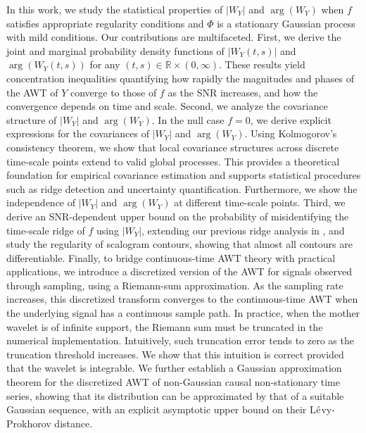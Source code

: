 \documentclass{amsart}
\begin{document}
In this work,
we study the statistical properties of $|W_{Y}|$ and $\arg(W_{Y})$ when $f$ satisfies appropriate regularity conditions and $\Phi$ is a stationary Gaussian process \cite{major1981lecture} with mild conditions.
Our contributions are multifaceted.
First, we derive the joint and marginal probability density functions of $|W_{Y}(t,s)|$ and $\arg(W_{Y}(t,s))$ for any $(t,s)\in \mathbb{R}\times (0,\infty)$.
These results yield concentration inequalities quantifying how rapidly the magnitudes and phases of the AWT of $Y$ converge to those of  $f$ as the SNR increases, and how the convergence depends on time and scale.
%
Second, we analyze the covariance structure of $|W_{Y}|$ and $\arg(W_{Y})$.
In the null case $f=0$, we derive explicit expressions for the covariances of $|W_{Y}|$ and $\arg(W_{Y})$. Using Kolmogorov's consistency theorem, we show that local covariance structures across discrete time-scale points extend to valid global processes. This provides a theoretical foundation for empirical covariance estimation and supports statistical procedures such as ridge detection and uncertainty quantification. Furthermore, we show the independence of $|W_{Y}|$ and $\arg(W_{Y})$ at different time-scale points.
%
Third, we derive an SNR-dependent upper bound on the probability of misidentifying the time-scale ridge of $f$ using $|W_Y|$, extending our previous ridge analysis in \cite{liu2024analyzing}, and study the regularity of scalogram contours, showing that almost all contours are differentiable.
Finally, to bridge continuous-time AWT theory with practical applications,
we introduce a discretized version of the AWT for signals observed through sampling, using a Riemann-sum
approximation. As the sampling rate increases, this discretized transform converges
 to the continuous-time AWT when the underlying signal has a continuous
 sample path. In practice, when the mother wavelet is of infinite support, the Riemann sum must be truncated in the numerical implementation. Intuitively, such truncation error tends to zero as the truncation threshold
 increases. We show that this intuition is correct provided that the wavelet is integrable.
We further establish a Gaussian approximation theorem for the discretized AWT of non-Gaussian causal non-stationary time series, showing that its distribution can be approximated by that of a suitable Gaussian sequence, with an explicit asymptotic upper bound on their L$\acute{\textup{e}}$vy-Prokhorov distance.
\end{document}
